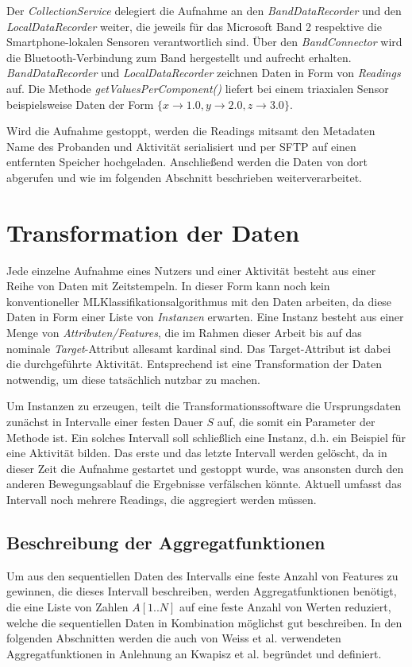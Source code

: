 Der \textit{CollectionService} delegiert die Aufnahme an den \textit{BandDataRecorder} und den \textit{LocalDataRecorder} weiter, die jeweils für das Microsoft Band 2 respektive die Smartphone-lokalen Sensoren verantwortlich sind. Über den \textit{BandConnector} wird die Bluetooth-Verbindung zum Band hergestellt und aufrecht erhalten. \textit{BandDataRecorder} und \textit{LocalDataRecorder} zeichnen Daten in Form von \textit{Readings} auf. Die Methode \textit{getValuesPerComponent()} liefert bei einem triaxialen Sensor beispielsweise Daten der Form $\{x \to 1.0, y \to 2.0, z \to 3.0\}$.

Wird die Aufnahme gestoppt, werden die Readings mitsamt den Metadaten Name des Probanden und Aktivität serialisiert und per SFTP auf einen entfernten Speicher hochgeladen. Anschließend werden die Daten von dort abgerufen und wie im folgenden Abschnitt beschrieben weiterverarbeitet.

\section{Transformation der Daten}
\label{sec:transformation}
Jede einzelne Aufnahme eines Nutzers und einer Aktivität besteht aus einer Reihe von Daten mit Zeitstempeln. In dieser Form kann noch kein konventioneller ML\hyph Klassifikationsalgorithmus mit den Daten arbeiten, da diese Daten in Form einer Liste von \textit{Instanzen} erwarten. Eine Instanz besteht aus einer Menge von \textit{Attributen/Features}, die im Rahmen dieser Arbeit bis auf das nominale \textit{Target}-Attribut allesamt kardinal sind. Das Target-Attribut ist dabei die durchgeführte Aktivität. Entsprechend ist eine Transformation der Daten notwendig, um diese tatsächlich nutzbar zu machen.

Um Instanzen zu erzeugen, teilt die Transformationssoftware die Ursprungsdaten zunächst in Intervalle einer festen Dauer $S$ auf, die somit ein Parameter der Methode ist. Ein solches Intervall soll schließlich eine Instanz, d.h. ein Beispiel für eine Aktivität bilden. Das erste und das letzte Intervall werden gelöscht, da in dieser Zeit die Aufnahme gestartet und gestoppt wurde, was ansonsten durch den anderen Bewegungsablauf die Ergebnisse verfälschen könnte. Aktuell umfasst das Intervall noch mehrere Readings, die aggregiert werden müssen.

\subsection{Beschreibung der Aggregatfunktionen}
Um aus den sequentiellen Daten des Intervalls eine feste Anzahl von Features zu gewinnen, die dieses Intervall beschreiben, werden Aggregatfunktionen benötigt, die eine Liste von Zahlen $A[1..N]$ auf eine feste Anzahl von Werten reduziert, welche die sequentiellen Daten in Kombination möglichst gut beschreiben. In den folgenden Abschnitten werden die auch von Weiss et al. verwendeten \cite{Weiss2016} Aggregatfunktionen in Anlehnung an Kwapisz et al. \cite{Kwapisz2011} begründet und definiert.
